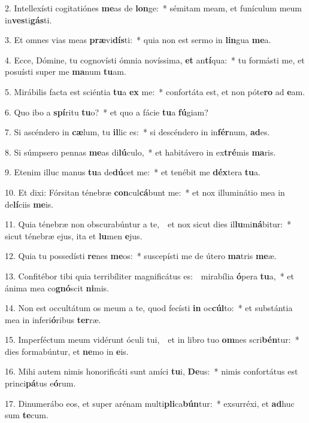 2. Intellexísti cogitatiónes \textbf{me}as de \textbf{lon}ge:~* sémitam meam, et funículum meum in\textbf{ves}ti\textbf{gás}ti.

3. Et omnes vias meas \textbf{præ}vi\textbf{dís}ti:~* quia non est sermo in \textbf{lin}gua \textbf{me}a.

4. Ecce, Dómine, tu cognovísti ómnia novíssima, \textbf{et} an\textbf{tí}qua:~* tu formásti me, et posuísti super me \textbf{ma}num \textbf{tu}am.

5. Mirábilis facta est sciéntia \textbf{tu}a \textbf{ex} me:~* confortáta est, et non póte\textbf{ro} ad \textbf{e}am.

6. Quo ibo a \textbf{spí}ritu \textbf{tu}o?~* et quo a fácie \textbf{tu}a \textbf{fú}giam?

7. Si ascéndero in \textbf{cæ}lum, tu \textbf{il}lic es:~* si descéndero in in\textbf{fér}num, \textbf{ad}es.

8. Si súmpsero pennas \textbf{me}as di\textbf{lú}culo,~* et habitávero in ex\textbf{tré}mis \textbf{ma}ris.

9. Etenim illuc manus \textbf{tu}a de\textbf{dú}cet me:~* et tenébit me \textbf{déx}tera \textbf{tu}a.

10. Et dixi: Fórsitan ténebræ \textbf{con}cul\textbf{cá}bunt me:~* et nox illuminátio mea in de\textbf{lí}ciis \textbf{me}is.

11. Quia ténebræ non obscurabúntur a te,~\GreDagger\ et nox sicut dies il\textbf{lu}mi\textbf{ná}bitur:~* sicut ténebræ ejus, ita et \textbf{lu}men \textbf{e}jus.

12. Quia tu possedísti \textbf{re}nes \textbf{me}os:~* suscepísti me de útero \textbf{ma}tris \textbf{me}æ.

13. Confitébor tibi quia terribíliter magnificátus es:~\GreDagger\ mirabília \textbf{ó}pera \textbf{tu}a,~* et ánima mea co\textbf{gnó}scit \textbf{ni}mis.

14. Non est occultátum os meum a te, quod fecísti \textbf{in} oc\textbf{cúl}to:~* et substántia mea in inferi\textbf{ó}ribus \textbf{ter}ræ.

15. Imperféctum meum vidérunt óculi tui,~\GreDagger\ et in libro tuo \textbf{om}nes scri\textbf{bén}tur:~* dies formabúntur, et \textbf{ne}mo in \textbf{e}is.

16. Mihi autem nimis honorificáti sunt amíci \textbf{tu}i, \textbf{De}us:~* nimis confortátus est princi\textbf{pá}tus e\textbf{ó}rum.

17. Dinumerábo eos, et super arénam multi\textbf{pli}ca\textbf{bún}tur:~* exsurréxi, et \textbf{ad}huc sum \textbf{te}cum.


